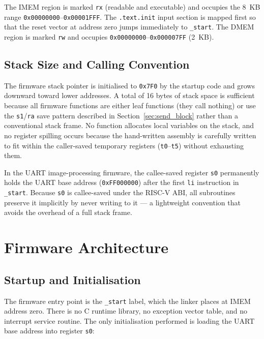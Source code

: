 The IMEM region is marked \texttt{rx} (readable and executable) and occupies the
8~KB range \texttt{0x00000000}--\texttt{0x00001FFF}. The \texttt{.text.init} input
section is mapped first so that the reset vector at address zero jumps immediately to
\texttt{\_start}. The DMEM region is marked \texttt{rw} and occupies
\texttt{0x00000000}--\texttt{0x000007FF} (2~KB).

\subsection{Stack Size and Calling Convention}

The firmware stack pointer is initialised to \texttt{0x7F0} by the startup code and
grows downward toward lower addresses. A total of 16 bytes of stack space is sufficient
because all firmware functions are either leaf functions (they call nothing) or use the
\texttt{s1}/\texttt{ra} save pattern described in Section~\ref{sec:send_block} rather
than a conventional stack frame. No function allocates local variables on the stack,
and no register spilling occurs because the hand-written assembly is carefully written
to fit within the caller-saved temporary registers (\texttt{t0}--\texttt{t5}) without
exhausting them.

In the UART image-processing firmware, the callee-saved register \texttt{s0} permanently
holds the UART base address (\texttt{0xFF000000}) after the first \texttt{li} instruction
in \texttt{\_start}. Because \texttt{s0} is callee-saved under the RISC-V ABI, all
subroutines preserve it implicitly by never writing to it — a lightweight convention
that avoids the overhead of a full stack frame.

\section{Firmware Architecture}
\label{sec:firmware_arch}

\subsection{Startup and Initialisation}

The firmware entry point is the \texttt{\_start} label, which the linker places at
IMEM address zero. There is no C runtime library, no exception vector table, and no
interrupt service routine. The only initialisation performed is loading the UART base
address into register \texttt{s0}:

